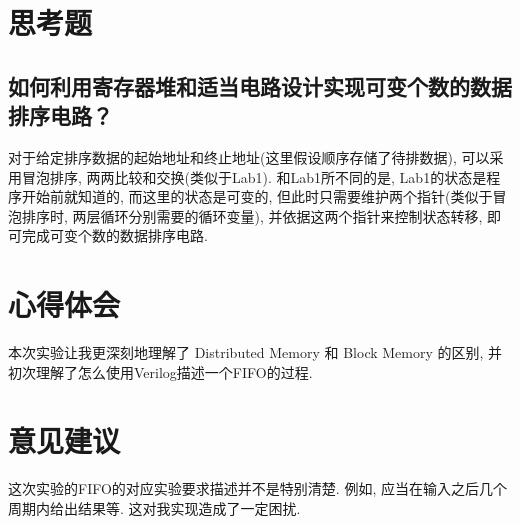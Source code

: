 \documentclass[UTF8]{article}
\begin{document}
\section{思考题}
\subsection{如何利用寄存器堆和适当电路设计实现可变个数的数据排序电路？}
对于给定排序数据的起始地址和终止地址(这里假设顺序存储了待排数据), 可以采用冒泡排序, 两两比较和交换(类似于Lab1). 和Lab1所不同的是, Lab1的状态是程序开始前就知道的, 而这里的状态是可变的, 但此时只需要维护两个指针(类似于冒泡排序时, 两层循环分别需要的循环变量), 并依据这两个指针来控制状态转移, 即可完成可变个数的数据排序电路.

\section{心得体会}
本次实验让我更深刻地理解了 Distributed Memory 和 Block Memory 的区别, 并初次理解了怎么使用Verilog描述一个FIFO的过程.

\section{意见建议}
这次实验的FIFO的对应实验要求描述并不是特别清楚. 例如, 应当在输入之后几个周期内给出结果等. 这对我实现造成了一定困扰.
\end{document}
